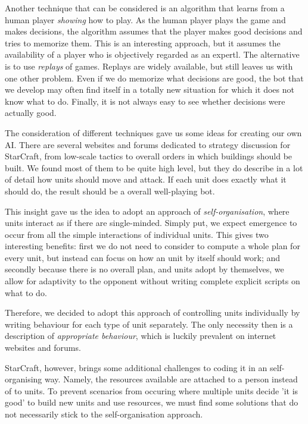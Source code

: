 Another technique that can be considered is an algorithm that learns from a human player \emph{showing} how to play. As the human player plays the game and makes decisions, the algorithm assumes that the player makes good decisions and tries to memorize them. This is an interesting approach, but it assumes the availability of a player who is objectively regarded as an expertl. The alternative is to use \emph{replays} of games. Replays are widely available, but still leaves us with one other problem. Even if we do memorize what decisions are good, the bot that we develop may often find itself in a totally new situation for which it does not know what to do. Finally, it is not always easy to see whether decisions were actually good.

The consideration of different techniques gave us some ideas for creating our own AI. There are several websites and forums dedicated to strategy discussion for StarCraft, from low-scale tactics to overall orders in which buildings should be built. We found most of them to be quite high level, but they do describe in a lot of detail how units should move and attack. If each unit does exactly what it should do, the result should be a overall well-playing bot.

This insight gave us the idea to adopt an approach of \emph{self-organisation}, where units interact as if there are single-minded. Simply put, we expect emergence to occur from all the simple interactions of individual units. This gives two interesting benefits: first we do not need to consider to compute a whole plan for every unit, but instead can focus on how an unit by itself should work; and secondly because there is no overall plan, and units adopt by themselves, we allow for adaptivity to the opponent without writing complete explicit scripts on what to do.

Therefore, we decided to adopt this approach of controlling units individually by writing behaviour for each type of unit separately. The only necessity then is a description of \emph{appropriate behaviour}, which is luckily prevalent on internet websites and forums.

StarCraft, however, brings some additional challenges to coding it in an self-organising way. Namely, the resources available are attached to a person instead of to units. To prevent scenarios from occuring where multiple units decide 'it is good' to build new units and use resources, we must find some solutions that do not necessarily stick to the self-organisation approach.


